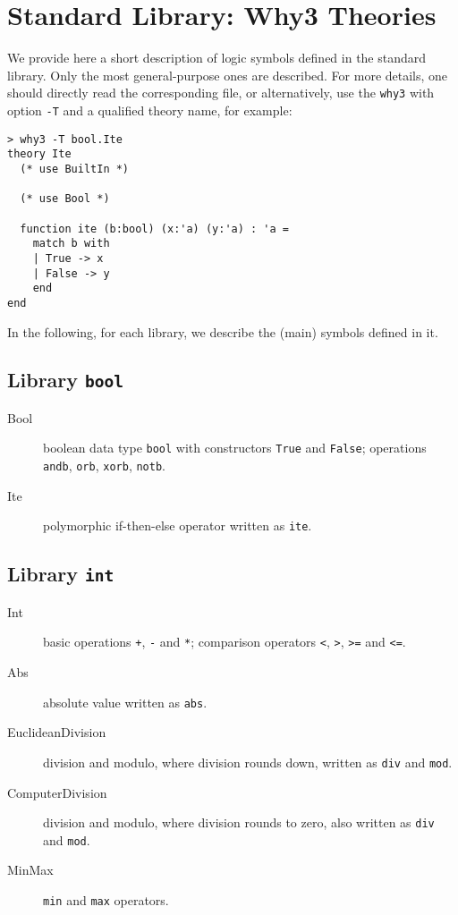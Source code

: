 \chapter{Standard Library: Why3 Theories}
\label{chap:library}

We provide here a short description of logic symbols defined in the
standard library. Only the most general-purpose ones are
described. For more details, one should directly read the
corresponding file, or alternatively, use the \verb|why3| with option
\verb|-T| and a qualified theory name, for example:
\begin{verbatim}
> why3 -T bool.Ite
theory Ite
  (* use BuiltIn *)

  (* use Bool *)

  function ite (b:bool) (x:'a) (y:'a) : 'a =
    match b with
    | True -> x
    | False -> y
    end
end
\end{verbatim}

In the following, for each library, we describe the (main) symbols
defined in it.

\section{Library \texttt{bool}}

\begin{description}

\item[Bool] boolean data type \verb|bool| with constructors \verb|True| and
  \verb|False|; operations \verb|andb|, \verb|orb|, \verb|xorb|, \verb|notb|.

\item[Ite] polymorphic if-then-else operator written as \verb|ite|.

\end{description}

\section{Library \texttt{int}}

\begin{description}

\item[Int] basic operations \verb|+|, \verb|-| and \verb|*|; comparison
  operators \verb|<|, \verb|>|, \verb|>=| and \verb|<=|.

\item[Abs] absolute value written as \verb|abs|.

\item[EuclideanDivision] division and modulo, where division rounds
  down, written as \verb|div| and \verb|mod|.

\item[ComputerDivision] division and modulo, where division rounds to
  zero, also written as \verb|div| and \verb|mod|.

\item[MinMax] \verb|min| and \verb|max| operators.

\end{description}

